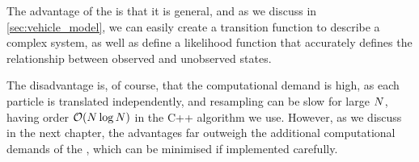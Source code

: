 The advantage of the \pf{} is that it is general, and as we discuss in \cref{sec:vehicle_model}, we can easily create a transition function to describe a complex system, as well as define a likelihood function that accurately defines the relationship between observed and unobserved states.

The disadvantage is, of course, that the computational demand is high, as each particle is translated independently, and resampling can be slow for large $N$, having order $\mathcal{O}(N\log N)$ in the C++ algorithm we use. However, as we discuss in the next chapter, the advantages far outweigh the additional computational demands of the \pf{}, which can be minimised if implemented carefully.
